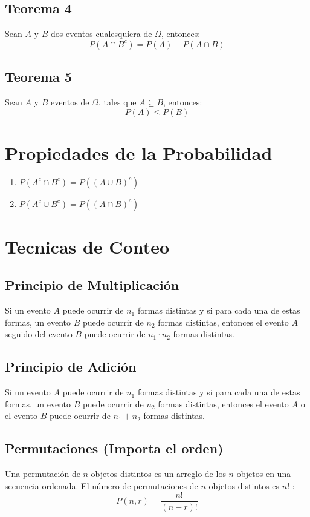 \documentclass{templateNote}
\begin{document}
\subsection{Teorema 4}
\indent
Sean $A$ y $B$ dos eventos cualesquiera de $\Omega$, entonces:
\begin{equation*}
    P(A \cap B^c) = P(A) - P(A \cap B)
\end{equation*}

\subsection{Teorema 5}
\indent
Sean $A$ y $B$ eventos de $\Omega$, tales que $A \subseteq B$, entonces:
\begin{equation*}
    P(A) \leq P(B)
\end{equation*}
\section{Propiedades de la Probabilidad}
\begin{enumerate}
    \item $P(A^c \cap B^c) = P((A \cup B)^c)$
    \item $P(A^c \cup B^c) = P((A \cap B)^c)$
\end{enumerate}

\newpage
\section{Tecnicas de Conteo}
\subsection{Principio de Multiplicación}
\indent
Si un evento $A$ puede ocurrir de $n_1$ formas distintas y si para cada una de estas formas, un evento $B$ puede ocurrir de $n_2$ formas distintas, entonces el evento $A$ seguido del evento $B$ puede ocurrir de $n_1 \cdot n_2$ formas distintas.
\subsection{Principio de Adición}
\indent
Si un evento $A$ puede ocurrir de $n_1$ formas distintas y si para cada una de estas formas, un evento $B$ puede ocurrir de $n_2$ formas distintas, entonces el evento $A$ o el evento $B$ puede ocurrir de $n_1 + n_2$ formas distintas.

\subsection{Permutaciones (Importa el orden)}
\indent
Una permutación de $n$ objetos distintos es un arreglo de los $n$ objetos en una secuencia ordenada. El número de permutaciones de $n$ objetos distintos es $n!$ :
\begin{equation*}
    P(n, r) = \frac{n!}{(n - r)!}
\end{equation*}
\end{document}
